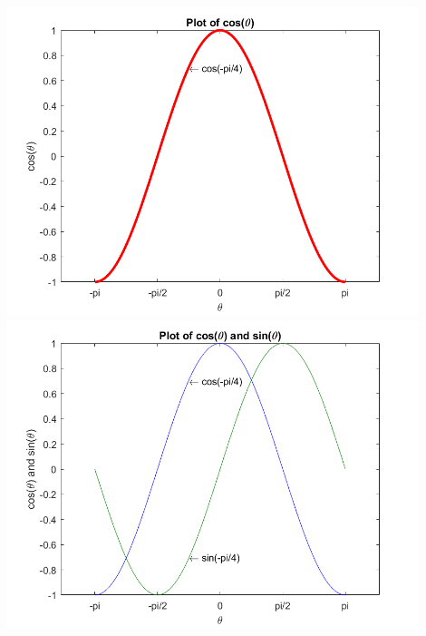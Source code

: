 \documentclass[a4paper,11pt]{article}
\begin{document}
\Centering
\includegraphics[height = 90mm]{cos.png}
\includegraphics[height = 90mm]{cos_sin.png}
\end{document}
